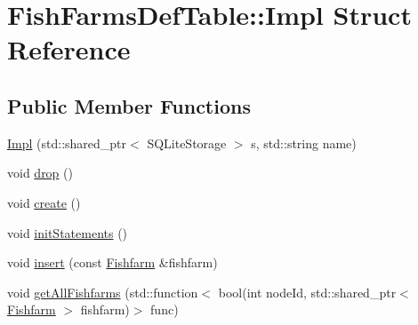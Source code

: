 \hypertarget{struct_fish_farms_def_table_1_1_impl}{}\section{Fish\+Farms\+Def\+Table\+::Impl Struct Reference}
\label{struct_fish_farms_def_table_1_1_impl}
\subsection*{Public Member Functions}
\begin{DoxyCompactItemize}
\item 
\mbox{\hyperlink{struct_fish_farms_def_table_1_1_impl_ae295ab3a54c48e5fcbd20b5d9190d575}{Impl}} (std\+::shared\+\_\+ptr$<$ S\+Q\+Lite\+Storage $>$ s, std\+::string name)
\item 
void \mbox{\hyperlink{struct_fish_farms_def_table_1_1_impl_a2e68781f75b788dd99a478bac71bfed1}{drop}} ()
\item 
void \mbox{\hyperlink{struct_fish_farms_def_table_1_1_impl_a36350085c8dac74cfb57dfe9dc7c03bf}{create}} ()
\item 
void \mbox{\hyperlink{struct_fish_farms_def_table_1_1_impl_a794738956a9046a85430797204265fd0}{init\+Statements}} ()
\item 
void \mbox{\hyperlink{struct_fish_farms_def_table_1_1_impl_a7a9bc5b2d6f8e934048c05f999d93388}{insert}} (const \mbox{\hyperlink{class_fishfarm}{Fishfarm}} \&fishfarm)
\item 
void \mbox{\hyperlink{struct_fish_farms_def_table_1_1_impl_aee77d57fc5ff27e2f0400a8b2e109b23}{get\+All\+Fishfarms}} (std\+::function$<$ bool(int node\+Id, std\+::shared\+\_\+ptr$<$ \mbox{\hyperlink{class_fishfarm}{Fishfarm}} $>$ fishfarm)$>$ func)
\end{DoxyCompactItemize}
